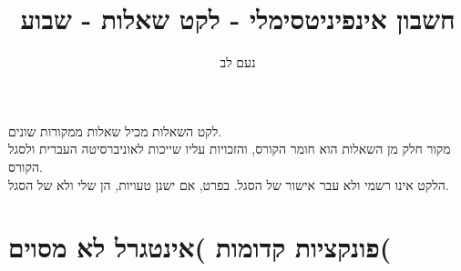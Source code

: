\documentclass[english,hebrew]{article}
\theoremstyle{definition}
\theoremstyle{definition}
\begin{document}
\title{חשבון אינפיניטסימלי {\endL} - לקט שאלות - שבוע {\endL}}
\author{נעם לב}

\maketitle
\noindent{}
\begin{center}
לקט השאלות מכיל שאלות ממקורות שונים.\\
מקור חלק מן השאלות הוא חומר הקורס, והזכויות עליו שייכות לאוניברסיטה
העברית ולסגל הקורס.\\
הלקט אינו רשמי ולא עבר אישור של הסגל. בפרט, אם ישנן טעויות, הן שלי
ולא של הסגל.
\par\end{center}

\medskip{}

\tableofcontents{}

\newpage{}

\part{פונקציות קדומות )אינטגרל לא מסוים(}
\end{document}
